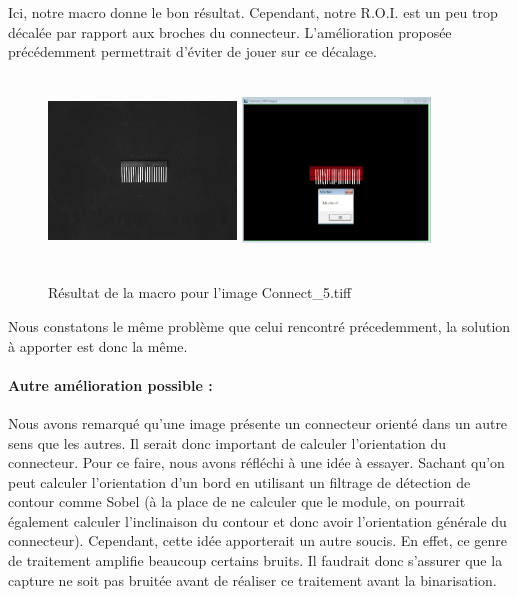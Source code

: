 \documentclass{scrreprt}
\begin{document}
Ici, notre macro donne le bon résultat. Cependant, notre R.O.I. est un peu trop décalée par rapport aux broches du connecteur. L'amélioration
proposée précédemment permettrait d'éviter de jouer sur ce décalage. 

\newpage
\begin{figure}[!h]
\centering
\includegraphics[width=5cm, height=5cm]{images/Connect5o.png}\hfill
\includegraphics[width=5cm, height=5cm]{images/connecteur5.png}
\caption{Résultat de la macro pour l'image Connect_5.tiff}
\end{figure}

Nous constatons le même problème que celui rencontré précedemment, la solution à apporter est donc la même. 

\paragraph{Autre amélioration possible : } 
Nous avons remarqué qu'une image présente un connecteur orienté dans un autre sens que les autres.
Il serait donc important de calculer l'orientation du connecteur. Pour ce faire, nous avons réfléchi à une
idée à essayer. Sachant qu'on peut calculer l'orientation d'un bord en utilisant un filtrage de détection 
de contour comme Sobel (à la place de ne calculer que le module, on pourrait également calculer l'inclinaison 
du contour et donc avoir l'orientation générale du connecteur). Cependant, cette idée apporterait un autre soucis.
En effet, ce genre de traitement amplifie beaucoup certains bruits. Il faudrait donc s'assurer que la capture ne soit
pas bruitée avant de réaliser ce traitement avant la binarisation.   
\end{document}
